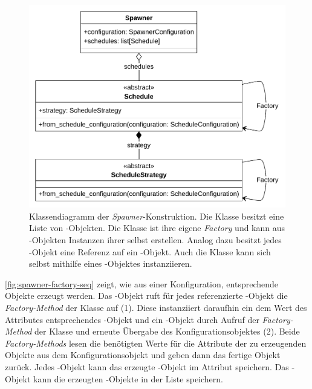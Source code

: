 \begin{figure}[!ht]
	\centering
	\includegraphics[width=1.0\linewidth]{images/diagrams/spawner-factory-class.pdf}
	\caption{Klassendiagramm der \emph{Spawner}-Konstruktion. Die Klasse  besitzt eine Liste von -Objekten. Die Klasse  ist ihre eigene \emph{Factory} und kann aus -Objekten Instanzen ihrer selbst erstellen. Analog dazu besitzt jedes -Objekt eine Referenz auf ein -Objekt. Auch die Klasse  kann sich selbst mithilfe eines -Objektes instanziieren.}
	\label{fig:spawner-factory-class}
\end{figure}

\autoref{fig:spawner-factory-seq} zeigt, wie aus einer Konfiguration, entsprechende Objekte erzeugt werden. Das -Objekt ruft für jedes referenzierte -Objekt die \emph{Factory-Method} der Klasse  auf (1). Diese instanziiert daraufhin ein dem Wert des Attributes  entsprechendes -Objekt und ein -Objekt durch Aufruf der \emph{Factory-Method} der Klasse  und erneute Übergabe des Konfigurationsobjektes (2). Beide \emph{Factory-Methods} lesen die benötigten Werte für die Attribute der zu erzeugenden Objekte aus dem Konfigurationsobjekt und geben dann das fertige Objekt zurück. Jedes -Objekt kann das erzeugte -Objekt im Attribut  speichern. Das -Objekt kann die erzeugten -Objekte in der Liste  speichern.

